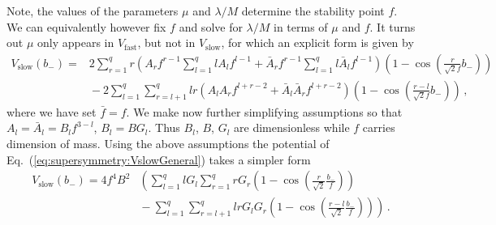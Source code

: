 \documentclass[12pt]{article}
\begin{document}
Note, the values of the parameters $\mu$ and $\lambda / M$ determine the stability point $f$.
We can equivalently however fix $f$ and solve for $\lambda / M$ in terms of $\mu$ and $f$.
It turns out $\mu$ only appears in $V_\text{fast}$, but not in $V_\text{slow}$, for which an explicit form is given by
\begin{equation} \label{eq:supersymmetry:VslowGeneral}
  \begin{aligned}
    V_\text{slow}\left(b_-\right) =
      &2 \sum_{r = 1}^q r
        \left(A_r f^{r - 1} \sum_{l = 1}^q l A_l f^{l - 1}
          + \bar A_r f^{r - 1} \sum_{l = 1}^q l \bar A_l f^{l - 1}\right)
        \left(1 - \cos\left(\frac{r}{\sqrt 2 f} b_-\right)\right)\\
      &{} - 2 \sum_{l = 1}^q \sum_{r = l + 1}^q
        l r \left(A_l A_r f^{l + r - 2} + \bar A_l \bar A_r f^{l + r - 2}\right)
        \left(1 - \cos\left(\frac{r - l}{\sqrt 2 f} b_-\right)\right)\,,
  \end{aligned}
\end{equation}
where we have set $\bar f = f$.
We make now further simplifying assumptions so that $A_l = \bar A_l = B_l f^{3 - l}$, $B_l = B G_l$.
Thus $B_l$, $B$, $G_l$ are dimensionless while $f$ carries dimension of mass.
Using the above assumptions the potential of Eq.~(\ref{eq:supersymmetry:VslowGeneral}) takes a simpler form
\begin{equation} \label{eq:supersymmetry:Vslow}
  \begin{aligned}
    V_\text{slow}\left(b_-\right) = 4 f^4 B^2 &\left(
      \sum_{l = 1}^q l G_l \sum_{r = 1}^q r G_r
        \left(1 - \cos\left(\frac{r}{\sqrt{2}} \frac{b_-}{f}\right)\right)\right. \\
      &\left.{} - \sum_{l = 1}^q \sum_{r = l + 1}^q l r G_l G_r
        \left(1 - \cos\left(\frac{r - l}{\sqrt{2}} \frac{b_-}{f}\right)\right)
    \right)\,.
  \end{aligned}
\end{equation}
\end{document}
